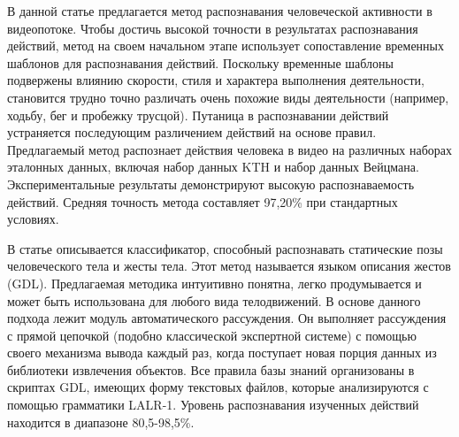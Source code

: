 В данной статье \cite{rule3} предлагается метод распознавания человеческой активности в видеопотоке. Чтобы достичь высокой точности в результатах распознавания действий, метод на своем начальном этапе использует сопоставление временных шаблонов для распознавания действий. Поскольку временные шаблоны подвержены влиянию скорости, стиля и характера выполнения деятельности, становится трудно точно различать очень похожие виды деятельности (например, ходьбу, бег и пробежку трусцой). Путаница в распознавании действий устраняется последующим различением действий на основе правил. 
\clearpage
Предлагаемый метод распознает действия человека в видео на различных наборах эталонных данных, включая набор данных KTH и набор данных Вейцмана. Экспериментальные результаты демонстрируют высокую распознаваемость действий. Средняя точность метода составляет 97,20\% при стандартных условиях. 



В статье \cite{rule4} описывается классификатор, способный распознавать статические позы человеческого тела и жесты тела. Этот метод называется языком описания жестов (GDL). Предлагаемая методика интуитивно понятна, легко продумывается и может быть использована для любого вида телодвижений. В основе данного подхода лежит модуль автоматического рассуждения. Он выполняет рассуждения с прямой цепочкой (подобно классической экспертной системе) с помощью своего механизма вывода каждый раз, когда поступает новая порция данных из библиотеки извлечения объектов.  Все правила базы знаний организованы в скриптах GDL, имеющих форму текстовых файлов, которые анализируются с помощью грамматики LALR-1. Уровень распознавания изученных действий находится в диапазоне 80,5-98,5\%.


